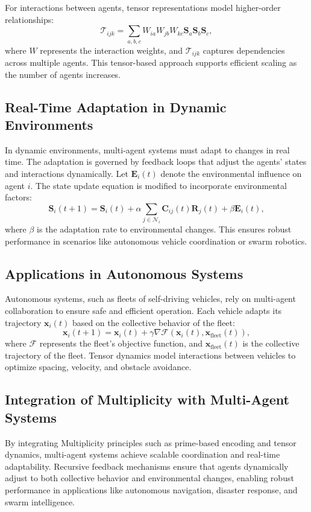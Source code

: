 \documentclass{article}
\theoremstyle{plain}
\begin{document}
For interactions between agents, tensor representations model higher-order relationships:
\begin{equation}
\mathcal{T}_{ijk} = \sum_{a,b,c} W_{ia} W_{jb} W_{kc} \mathbf{S}_a \mathbf{S}_b \mathbf{S}_c,
\end{equation}
where \( W \) represents the interaction weights, and \( \mathcal{T}_{ijk} \) captures dependencies across multiple agents. This tensor-based approach supports efficient scaling as the number of agents increases.

\subsection{Real-Time Adaptation in Dynamic Environments}
In dynamic environments, multi-agent systems must adapt to changes in real time. The adaptation is governed by feedback loops that adjust the agents' states and interactions dynamically. Let \( \mathbf{E}_i(t) \) denote the environmental influence on agent \( i \). The state update equation is modified to incorporate environmental factors:
\begin{equation}
\mathbf{S}_i(t+1) = \mathbf{S}_i(t) + \alpha \sum_{j \in \mathcal{N}_i} \mathbf{C}_{ij}(t) \mathbf{R}_j(t) + \beta \mathbf{E}_i(t),
\end{equation}
where \( \beta \) is the adaptation rate to environmental changes. This ensures robust performance in scenarios like autonomous vehicle coordination or swarm robotics.

\subsection{Applications in Autonomous Systems}
Autonomous systems, such as fleets of self-driving vehicles, rely on multi-agent collaboration to ensure safe and efficient operation. Each vehicle adapts its trajectory \( \mathbf{x}_i(t) \) based on the collective behavior of the fleet:
\begin{equation}
\mathbf{x}_i(t+1) = \mathbf{x}_i(t) + \gamma \nabla \mathcal{F}(\mathbf{x}_i(t), \mathbf{x}_{\text{fleet}}(t)),
\end{equation}
where \( \mathcal{F} \) represents the fleet’s objective function, and \( \mathbf{x}_{\text{fleet}}(t) \) is the collective trajectory of the fleet. Tensor dynamics model interactions between vehicles to optimize spacing, velocity, and obstacle avoidance.

\subsection{Integration of Multiplicity with Multi-Agent Systems}
By integrating Multiplicity principles such as prime-based encoding and tensor dynamics, multi-agent systems achieve scalable coordination and real-time adaptability. Recursive feedback mechanisms ensure that agents dynamically adjust to both collective behavior and environmental changes, enabling robust performance in applications like autonomous navigation, disaster response, and swarm intelligence.
\end{document}
